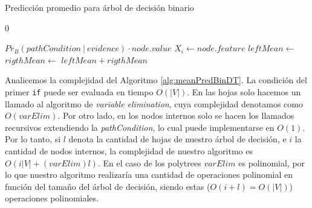\begin{algorithm}
\caption{Predicción promedio para árbol de decisión binario} \label{alg:meanPredBinDT}
\begin{algorithmic}[1]
        \State \Return  $0$
    \EndIf
    
        \State \Return  $Pr_B(pathCondition\ | \ evidence) \cdot node.value$
    \EndIf
    \State $X_i \gets node.feature$
    \State $leftMean \gets$  
    \State $rigthMean\gets$  
    \State \Return  \mbox{$leftMean + rigthMean$}
\EndFunction
\end{algorithmic}
\end{algorithm}

Analicemos la complejidad del Algoritmo \ref{alg:meanPredBinDT}. La condición del primer \texttt{if} puede ser evaluada en tiempo $O(|V|)$. En las hojas solo hacemos un llamado al algoritmo de \textit{variable elimination}, cuya complejidad denotamos como $O(varElim)$. Por otro lado, en los nodos internos solo se hacen los llamados recursivos extendiendo la \textit{pathCondition}, lo cual puede implementarse en $O(1)$. Por lo tanto, si $l$ denota la cantidad de hojas de nuestro árbol de decisión, e $i$ la cantidad de nodos internos, la complejidad de nuestro algoritmo es $O(i|V| + (varElim)l)$. En el caso de los polytrees $varElim$ es polinomial, por lo que nuestro algoritmo realizaría una cantidad de operaciones polinomial en función del tamaño del árbol de decisión, siendo estas ($O(i + l) = O(|V|)$) operaciones polinomiales. %





